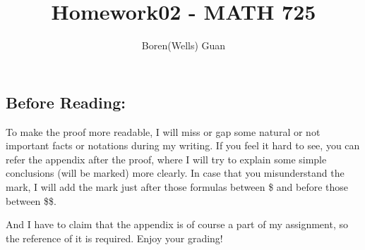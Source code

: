 \documentclass[lang=en,11pt,a4paper,citestyle =authoryear]{elegantpaper}
\title{Homework02 - MATH 725}
\author{Boren(Wells) Guan}
\begin{document}
\maketitle

\subsection*{Before Reading:}\par
To make the proof more readable, I will miss or gap some natural or not important facts or notations during my writing. If you feel it hard to see, you can refer the appendix after the proof, where I will try to explain some simple conclusions (will be marked) more clearly. In case that you misunderstand the mark, I will add the mark just after those formulas between \$ and before those between \$\$.\par
And I have to claim that the appendix is of course a part of my assignment, so the reference of it is required. Enjoy your grading!
\end{document}
